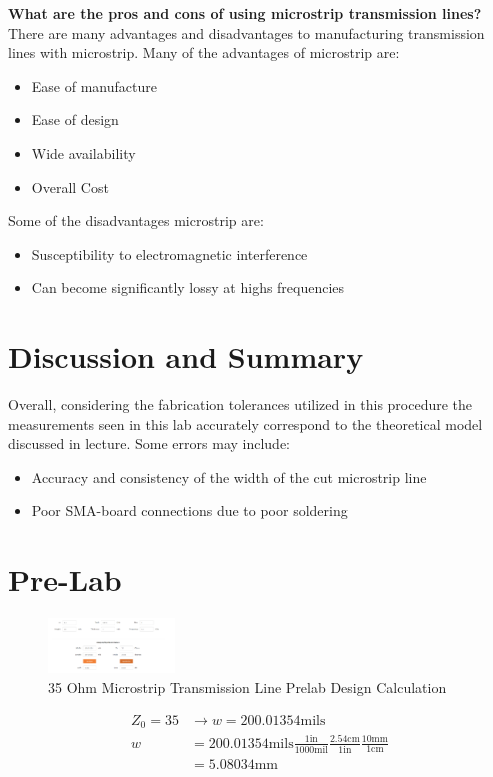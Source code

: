 \documentclass[journal]{IEEEtran}
\begin{document}
\textbf{What are the pros and cons of using microstrip transmission lines?}
There are many advantages and disadvantages to manufacturing transmission lines with microstrip.
Many of the advantages of microstrip are:
\begin{itemize}
    \item Ease of manufacture
    \item Ease of design
    \item Wide availability
    \item Overall Cost
\end{itemize}
Some of the disadvantages microstrip are:
\begin{itemize}
    \item Susceptibility to electromagnetic interference
    \item Can become significantly lossy at highs frequencies
\end{itemize}


\section{Discussion and Summary}

Overall, considering the fabrication tolerances utilized in this procedure the
measurements seen in this lab accurately correspond to the theoretical model
discussed in lecture. Some errors may include:
\begin{itemize}
    \item Accuracy and consistency of the width of the cut microstrip line
    \item Poor SMA-board connections due to poor soldering
\end{itemize}

\appendices
\section{Pre-Lab}


\begin{figure}[hp]
    \centering
    \includegraphics[width=0.3\textwidth]{design_35.png}
    \caption{35 Ohm Microstrip Transmission Line Prelab Design Calculation}
\end{figure}

\begin{align*}
    Z_{0} =35 & \rightarrow w=200.01354\text{mils}                                                                                   \\
    w         & =200.01354\text{mils}\frac{1\text{in}}{1000\text{mil}}\frac{2.54\text{cm}}{1\text{in}}\frac{10\text{mm}}{1\text{cm}} \\
              & =5.08034\text{mm}
\end{align*}
\end{document}
